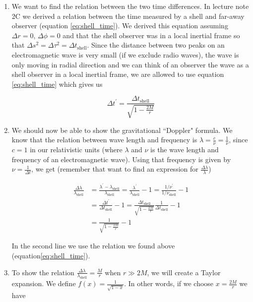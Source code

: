 \documentclass[a4paper,10pt,english]{article}
\begin{document}
\begin{enumerate}

\item We want to find the relation between the two time differences. In lecture note 2C we derived a relation between the time measured by a shell and far-away observer (equation \ref{eq:shell_time}). We derived this equation assuming $\Delta r=0$, $\Delta\phi=0$ and that the shell observer was in a local inertial frame so that $\Delta s^{2}=\Delta\tau^{2}=\Delta t_{\text{shell}}$. 
Since the distance between two peaks on an electromagnetic wave is very small (if we exclude radio waves), the wave is only moving in radial direction and we can think of an observer  the wave as a shell observer in a local inertial frame, we are allowed to use equation \ref{eq:shell_time} which gives us 

\[\Delta t^{\prime}=\frac{\Delta t_{\text{shell}}}{\sqrt{1-\frac{2M}{r}}}\]

\item We should now be able to show the gravitational ``Doppler" formula. We know that the relation between wave length and frequency is $\lambda=\frac{c}{\nu}=\frac{1}{\nu}$, since $c=1$ in our relativistic units (where $\lambda$ and $\nu$ is the wave length and frequency of an electromagnetic wave). Using that frequency is given by $\nu=\frac{1}{\Delta t}$, we get (remember that want to find an expression for $\frac{\Delta \lambda}{\lambda}$)

\begin{align*}
\frac{\Delta \lambda}{\lambda_{\text{shell}}}&=\frac{\lambda^{\prime}-\lambda_{\text{shell}}}{\lambda_{\text{shell}}}=\frac{\lambda^{\prime}}{\lambda_{\text{shell}}}-1=\frac{1/\nu^{\prime}}{1/\nu_{\text{shell}}}-1\\
&=\frac{\Delta t^{\prime}}{\Delta t_{\text{shell}}}-1=\frac{\Delta t_{\text{shell}}}{\sqrt{1-\frac{2M}{r}}}\frac{1}{\Delta t_{\text{shell}}}-1\\
&=\frac{1}{\sqrt{1-\frac{2M}{r}}}-1
\end{align*}

In the second line we use the relation we found above (equation\ref{eq:shell_time}).
  
\item To show the relation $\frac{\Delta \lambda}{\lambda_{\text{shell}}}=\frac{M}{r}$ when $r\gg2M$, we will create a Taylor expansion. We define $f(x)=\frac{1}{\sqrt{1-x}}$. In other words, if we choose $x=\frac{2M}{r}$ we have


\end{enumerate}
\end{document}
